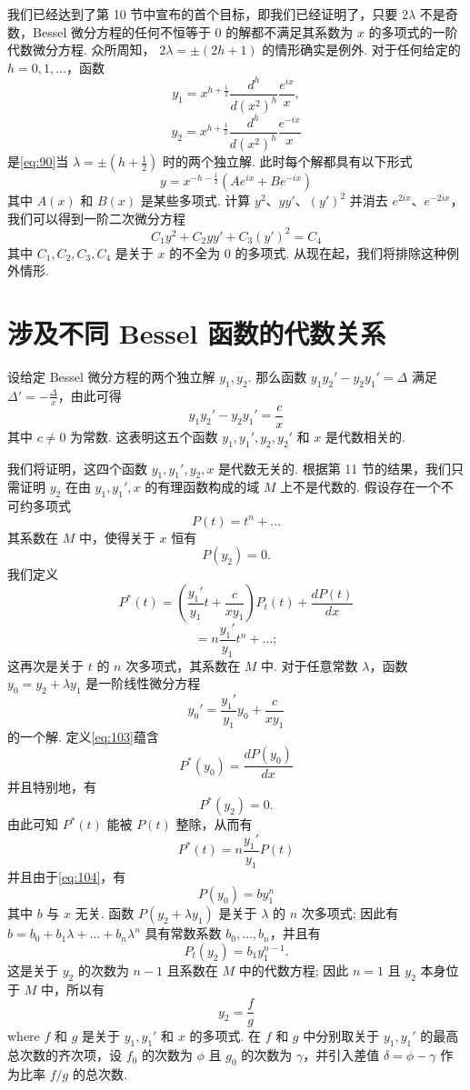 我们已经达到了第 10 节中宣布的首个目标，即我们已经证明了，只要 $2\lambda$ 不是奇数，Bessel 微分方程的任何不恒等于 0 的解都不满足其系数为 $x$ 的多项式的一阶代数微分方程. 众所周知， $2\lambda = \pm (2h+1)$ 的情形确实是例外. 对于任何给定的 $h=0,1,\dots$，函数
\[y_{1} = x^{h+\frac{1}{2}} \frac{d^{h}}{d(x^{2})^{h}} \frac{e^{ix}}{x},\]
\[y_{2} = x^{h+\frac{1}{2}} \frac{d^{h}}{d(x^{2})^{h}} \frac{e^{-ix}}{x}\]
是\eqref{eq:90}当 $\lambda = \pm (h + \frac{1}{2})$ 时的两个独立解. 此时每个解都具有以下形式
\[y = x^{-h-\frac{1}{2}} (Ae^{ix} + Be^{-ix})\]
其中 $A(x)$ 和 $B(x)$ 是某些多项式. 计算 $y^2$、$yy'$、$(y')^2$ 并消去 $e^{2ix}$、$e^{-2ix}$，我们可以得到一阶二次微分方程
\[C_1 y^2 + C_2 yy' + C_3 (y')^2 = C_4\]
其中 $C_1, C_2, C_3, C_4$ 是关于 $x$ 的不全为 0 的多项式. 从现在起，我们将排除这种例外情形.

\section{涉及不同 Bessel 函数的代数关系}

设给定 Bessel 微分方程的两个独立解 $y_1, y_2$. 那么函数 $y_1 y_2' - y_2 y_1' = \Delta$ 满足 $\Delta' = -\frac{\Delta}{x}$，由此可得
\begin{equation}
y_1 y_2' - y_2 y_1' = \frac{c}{x} \tag{102}\label{eq:102}
\end{equation}
其中 $c \neq 0$ 为常数. 这表明这五个函数 $y_1, y_1', y_2, y_2'$ 和 $x$ 是代数相关的.

我们将证明，这四个函数 $y_1, y_1', y_2, x$ 是代数无关的. 根据第 11 节的结果，我们只需证明 $y_2$ 在由 $y_1, y_1', x$ 的有理函数构成的域 $M$ 上不是代数的. 假设存在一个不可约多项式
\[P(t) = t^n + \dots\]
其系数在 $M$ 中，使得关于 $x$ 恒有
\[P(y_2) = 0.\]
我们定义
\begin{equation}
P^*(t) = \left(\frac{y_1'}{y_1} t + \frac{c}{x y_1}\right) P_t(t) + \frac{dP(t)}{dx} \tag{103}\label{eq:103}
\end{equation}
\[= n \frac{y_1'}{y_1} t^n + \dots;\]
这再次是关于 $t$ 的 $n$ 次多项式，其系数在 $M$ 中. 对于任意常数 $\lambda$，函数 $y_0 = y_2 + \lambda y_1$ 是一阶线性微分方程
\[y_0' = \frac{y_1'}{y_1} y_0 + \frac{c}{x y_1}\]
的一个解. 定义\eqref{eq:103}蕴含
\begin{equation}
P^*(y_0) = \frac{dP(y_0)}{dx} \tag{104}\label{eq:104}
\end{equation}
并且特别地，有
\[P^*(y_2) = 0.\]
由此可知 $P^*(t)$ 能被 $P(t)$ 整除，从而有
\[P^*(t) = n \frac{y_1'}{y_1} P(t)\]
并且由于\eqref{eq:104}，有
\begin{equation}
P(y_0) = b y_1^n \tag{105}\label{eq:105}
\end{equation}
其中 $b$ 与 $x$ 无关. 函数 $P(y_2 + \lambda y_1)$ 是关于 $\lambda$ 的 $n$ 次多项式; 因此有 $b = b_0 + b_1 \lambda + \dots + b_n \lambda^n$ 具有常数系数 $b_0, \dots, b_n$，并且有
\[P_t(y_2) = b_1 y_1^{n-1}.\]
这是关于 $y_2$ 的次数为 $n-1$ 且系数在 $M$ 中的代数方程; 因此 $n=1$ 且 $y_2$ 本身位于 $M$ 中，所以有
\[y_2 = \frac{f}{g}\]
where $f$ 和 $g$ 是关于 $y_1, y_1'$ 和 $x$ 的多项式. 在 $f$ 和 $g$ 中分别取关于 $y_1, y_1'$ 的最高总次数的齐次项，设 $f_0$ 的次数为 $\phi$ 且 $g_0$ 的次数为 $\gamma$，并引入差值 $\delta = \phi - \gamma$ 作为比率 $f/g$ 的总次数.

